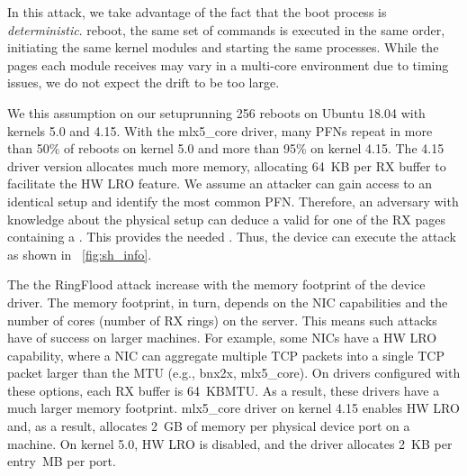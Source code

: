 In this attack, we take advantage of the fact that the boot process is \emph{deterministic}. \DIFdelbegin {}\DIFdelend \DIFaddbegin {}\DIFaddend reboot, the same set of commands is executed in the same order, initiating the same kernel modules and starting the same processes. While the pages each module receives may vary in a multi-core environment due to timing issues, we do not expect the drift to be too large. 

We \DIFdelbegin {}\DIFdelend \DIFaddbegin {}\DIFaddend this assumption on our setup\DIFaddbegin \DIFadd{, }\DIFaddend running 256 reboots on Ubuntu 18.04 with \DIFdelbegin {}\DIFdelend \DIFaddbegin {}\DIFaddend kernels 5.0 and 4.15. With the mlx5\_core driver, many PFNs repeat in more than 50\%  \DIFdelbegin {}\DIFdelend of reboots on kernel 5.0 and more than 95\% on kernel 4.15. The 4.15 driver version allocates much more memory, allocating 64~KB per RX buffer to facilitate the HW LRO feature. We assume an attacker can gain access to an identical setup and identify the most common PFN. Therefore, an adversary with knowledge about the physical setup can deduce a valid \kva{} for one of the RX pages containing a \mabaf. This provides the needed \kva. Thus, the device can execute the attack as shown in \DIFdelbegin {}\DIFdelend \DIFaddbegin {}\DIFaddend ~\ref{fig:sh_info}.

The \DIFdelbegin {}\DIFdelend \DIFaddbegin {}\DIFaddend the RingFlood attack increase with the memory footprint of the device driver. The memory footprint, in turn, depends on the NIC capabilities and the number of cores (number of RX rings) on the server. This means \DIFdelbegin {}\DIFdelend such attacks have \DIFdelbegin {}\DIFdelend \DIFaddbegin {}\DIFaddend of success on larger machines. 
For example, some NICs have a HW LRO capability\cite{mlx5_lro}, where a NIC can aggregate multiple TCP packets into a single TCP packet \DIFdelbegin \DIFdel{, }\DIFdelend \DIFaddbegin {}\DIFaddend larger than the MTU (e.g., bnx2x, mlx5\_core). On drivers configured with these options, each RX buffer is 64~KB\DIFdelbegin {}\DIFdelend \DIFaddbegin {}\DIFaddend MTU. As a result, these drivers have a much larger memory footprint. \DIFdelbegin {}\DIFdelend \DIFaddbegin {}\DIFaddend mlx5\_core driver on kernel 4.15 \DIFdelbegin \DIFdel{, }\DIFdelend enables HW LRO and, as a result, allocates 2~GB of memory per physical device port on a \DIFdelbegin {}\DIFdelend \DIFaddbegin {}\DIFaddend machine. On kernel 5.0, HW LRO is disabled, and the driver allocates 2~KB per entry\DIFdelbegin {}\DIFdelend \DIFaddbegin {}~MB per port.

